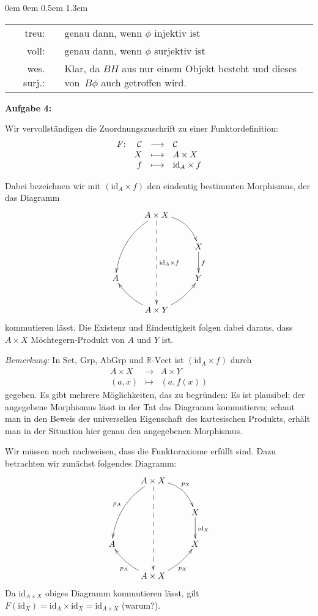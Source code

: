 \documentclass[a4paper,ngerman]{scrartcl}
\newcommand{\cmark}{\ding{51}}
\theoremstyle{definition}
\theoremstyle{plain}
\theoremstyle{remark}
\newcommand{\C}{\mathcal{C}}
\newcommand{\Set}{\mathrm{Set}}
\newcommand{\id}{\mathrm{id}}
\newcommand{\Grp}{\mathrm{Grp}}
\newcommand{\AbGrp}{\mathrm{AbGrp}}
\begin{document}
\begin{list}{}{0em \leftmargin0em \itemindent0.5em \itemsep 1.3em}
\begin{enumerate}
\begin{tabular}{ r c p{12cm} }
  treu: & & genau dann, wenn $\phi$ injektiv ist\\
  voll: & & genau dann, wenn $\phi$ surjektiv ist\\
  wes. surj.: & \cmark & Klar, da $BH$ aus nur einem Objekt besteht und dieses von~$B\phi$ auch getroffen wird.
\end{tabular}
\end{enumerate}

\newpage
\item[\textbf{Aufgabe 4:}]\mbox{}


Wir vervollständigen die Zuordnungszuschrift zu einer Funktordefinition:
\[ \begin{array}{@{}rrcl@{}}
  F{:} & \C &\longrightarrow& \C \\
  & X &\longmapsto& A \times X\\
  & f &\longmapsto& \id_A \times f
\end{array} \]

Dabei bezeichnen wir mit $(\id_A \times f)$ den eindeutig bestimmten Morphismus, der das Diagramm
\[ \xymatrix{
  & A \times X \ar@/_1pc/[ddl] \ar@/^1pc/[dr] \ar@{-->}[ddd]^{\id_A \times f}\\
  && X \ar[d]^f\\
  A && Y\\
  & A \times Y \ar@/^/[ul] \ar@/_/[ur]
} \]
kommutieren lässt. Die Existenz und Eindeutigkeit folgen dabei daraus, dass $A \times X$ Möchtegern-Produkt von $A$ und $Y$ ist.

\emph{Bemerkung:} In $\Set$, $\Grp$, $\AbGrp$ und $\mathrm{\mathbb{R}\text{-}Vect}$ ist $(\id_A \times f)$ durch
\[ \begin{array}{ rcl }
  A \times X &\longrightarrow& A \times Y\\
  (a, x)     &\longmapsto&     (a, f(x))
\end{array} \]
gegeben. Es gibt mehrere Möglichkeiten, das zu begründen: Es ist plausibel; der angegebene Morphismus lässt in der Tat das Diagramm kommutieren; schaut man in den Beweis der universellen Eigenschaft des kartesischen Produkts, erhält man in der Situation hier genau den angegebenen Morphismus.

Wir müssen noch nachweisen, dass die Funktoraxiome erfüllt sind. Dazu betrachten wir zunächst folgendes Diagramm:
\[ \xymatrix{
  & A \times X \ar@/_1pc/[ddl]_{p_A} \ar@/^1pc/[dr]^{p_X} \ar@{-->}[ddd]\\
  && X \ar[d]^{\id_X}\\
  A && X\\
  & A \times X \ar@/^/[ul]^{p_A} \ar@/_/[ur]_{p_X}
} \]
Da $\id_{A \times X}$ obiges Diagramm kommutieren lässt, gilt $F(\id_X) = \id_A \times \id_X = \id_{A \times X}$ (warum?).


\end{list}
\end{document}
